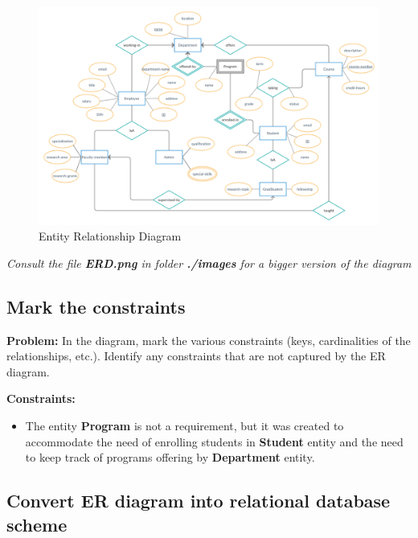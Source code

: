 \documentclass[a4paper]{article}
\begin{document}
\begin{figure}[h]
    \caption{Entity Relationship Diagram}
\includegraphics[scale=0.18]{ERD}
\centering
\end{figure}
\textit{Consult the file \textbf{ERD.png} in folder \textbf{./images} for a bigger version of the diagram}


\subsection{Mark the constraints}%
\label{sub:mark_the_constraints}

\textbf{Problem:}
In the diagram, mark the various constraints (keys, cardinalities of the relationships,
etc.). Identify any constraints that are not captured by the ER diagram.

\textbf{Constraints:}
\begin{itemize}
    \item The entity \textbf{Program} is not a requirement, but it was created to accommodate the need of enrolling students in \textbf{Student} entity and the need to keep track of programs offering by \textbf{Department} entity.
\end{itemize}

\newpage
\subsection{Convert ER diagram into relational database scheme}%
\label{sub:convert_er_diagraminto_relational_database_scheme}
\end{document}
